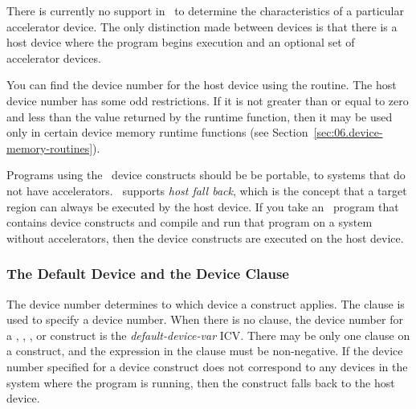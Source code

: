 There is currently no support in \OMP\ to determine the characteristics of a
particular accelerator device.  The only distinction made between devices is
that there is a host device where the program begins execution and an optional
set of accelerator devices.

You can find the device number for the host device using the
 routine.  The host device number has some odd
restrictions.  If it is not greater than or equal to zero and less than the
value returned by the  runtime function, then it may
be used only in certain device memory runtime functions (see
Section~\ref{sec:06.device-memory-routines}).

Programs using the \OMP\ device constructs should be be portable,
to systems that do not have accelerators.  \OMP\ supports \emph{host
fall back}, which is the concept that a target region can always be executed by
the host device.  If you take an \OMP\ program that contains device constructs
and compile and run that program on a system without accelerators, then the
device constructs are executed on the host device.

\subsubsection{The Default Device and the Device Clause}
\label{ssec:06.device-clause}

The device number determines to which device a construct applies.  The
 clause is used to specify a device number.  When there is no
 clause, the device number for a , , ,  or  construct is the \emph{default-device-var} ICV.  There may be only one
 clause on a construct, and the expression in the clause must be
non-negative.  If the device number specified for a device construct does not
correspond to any devices in the system where the program is running, then the
construct falls back to the host device.

